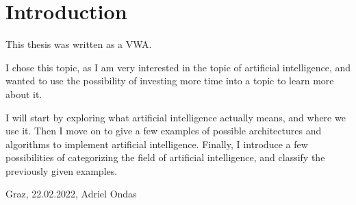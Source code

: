 \chapter{Introduction}
This thesis was written as a VWA.

I chose this topic, as I am very interested in the topic of artificial intelligence, and wanted to use the possibility of investing more time into a topic to learn more about it.

I will start by exploring what artificial intelligence actually means, and where we use it. Then I move on to give a few examples of possible architectures and algorithms to implement artificial intelligence. Finally, I introduce a few possibilities of categorizing the field of artificial intelligence, and classify the previously given examples.

Graz, 22.02.2022, Adriel Ondas